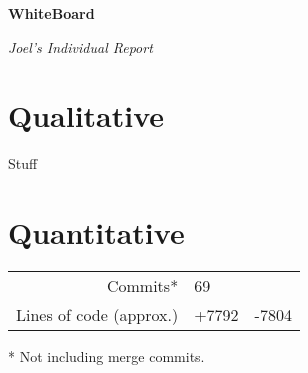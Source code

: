 \documentclass[12 pt]{article}
\begin{document}
\begin{center}

    \huge{\textbf{WhiteBoard}}

    \huge{\textit{Joel's Individual Report}}

\end{center}

\vspace{10 pt}

\section{Qualitative}

Stuff

\section{Quantitative}

\begin{tabular}{rll}

    Commits*&69&\\

    Lines of code (approx.)&+7792&-7804\\

\end{tabular}

\vspace{10 pt}

* Not including merge commits.
\end{document}
